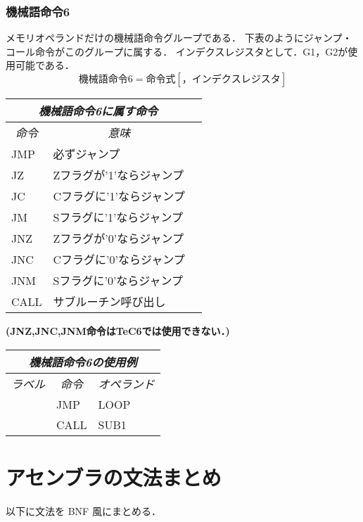 \subsubsection{機械語命令6}
メモリオペランドだけの機械語命令グループである．
下表のようにジャンプ・コール命令がこのグループに属する．
インデクスレジスタとして．G1，G2が使用可能である．
\[ 機械語命令6 = 命令　式　[，インデクスレジスタ]\]
\begin{center}
\begin{tabular}{lll}
\hline
\multicolumn{2}{c}{\it 機械語命令6に属す命令} \\
\hline
\multicolumn{1}{c}{\it 命令} & \multicolumn{1}{c}{\it 意味} \\
JMP & 必ずジャンプ \\
JZ  & Zフラグが'1'ならジャンプ \\
JC  & Cフラグに'1'ならジャンプ \\
JM  & Sフラグに'1'ならジャンプ \\
JNZ & Zフラグが'0'ならジャンプ \\
JNC & Cフラグに'0'ならジャンプ \\
JNM & Sフラグに'0'ならジャンプ \\
CALL & サブルーチン呼び出し \\
\hline
\end{tabular}

\vspace{0.2cm}
{\bf (JNZ,JNC,JNM命令はTeC6では使用できない．)}
\end{center}
\vspace{0.2cm}

\begin{center}
\tt\begin{tabular}{lll}
\hline
\multicolumn{3}{c}{\it 機械語命令6の使用例} \\
\hline
\multicolumn{1}{c}{\it ラベル} & 
        \multicolumn{1}{c}{\it 命令} & \multicolumn{1}{c}{\it オペランド} \\
  & JMP & LOOP \\
  & CALL & SUB1 \\
\hline
\end{tabular}
\end{center}
\vspace{0.2cm}

\newpage
\section{アセンブラの文法まとめ}
以下に文法を BNF 風にまとめる．\\
\vspace{0.3cm}

